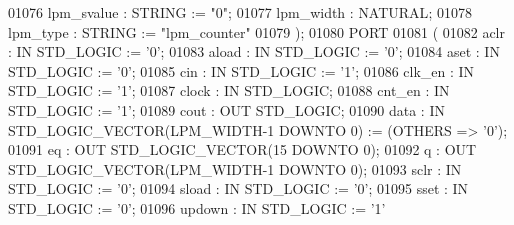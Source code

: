 \begin{DoxyCode}
{01076         lpm\_svalue  :   \textcolor{comment}{STRING} := "\textcolor{vhdllogic}{0}";
01077         lpm\_width   :   \textcolor{comment}{NATURAL};
01078         lpm\_type    :   \textcolor{comment}{STRING} := \textcolor{keyword}{"lpm\_counter"}
01079      );
01080      \textcolor{keywordflow}{PORT}
01081      ( 
01082         aclr    :   \textcolor{keywordflow}{IN} \textcolor{comment}{STD\_LOGIC} := '\textcolor{vhdllogic}{}\textcolor{vhdllogic}{0}';
01083         aload   :   \textcolor{keywordflow}{IN} \textcolor{comment}{STD\_LOGIC} := '\textcolor{vhdllogic}{}\textcolor{vhdllogic}{0}';
01084         aset    :   \textcolor{keywordflow}{IN} \textcolor{comment}{STD\_LOGIC} := '\textcolor{vhdllogic}{}\textcolor{vhdllogic}{0}';
01085         cin :   \textcolor{keywordflow}{IN} \textcolor{comment}{STD\_LOGIC} := '\textcolor{vhdllogic}{}\textcolor{vhdllogic}{1}';
01086         clk\_en  :   \textcolor{keywordflow}{IN} \textcolor{comment}{STD\_LOGIC} := '\textcolor{vhdllogic}{}\textcolor{vhdllogic}{1}';
01087         clock   :   \textcolor{keywordflow}{IN} \textcolor{comment}{STD\_LOGIC};
01088         cnt\_en  :   \textcolor{keywordflow}{IN} \textcolor{comment}{STD\_LOGIC} := '\textcolor{vhdllogic}{}\textcolor{vhdllogic}{1}';
01089         cout    :   \textcolor{keywordflow}{OUT} \textcolor{comment}{STD\_LOGIC};
01090         data    :   \textcolor{keywordflow}{IN} \textcolor{comment}{STD\_LOGIC\_VECTOR}(LPM\_WIDTH\textcolor{vhdlchar}{-}\textcolor{vhdllogic}{}\textcolor{vhdllogic}{1} \textcolor{keywordflow}{DOWNTO} \textcolor{vhdllogic}{}\textcolor{vhdllogic}{0}) := (\textcolor{keywordflow}{OTHERS} => '\textcolor{vhdllogic}{}\textcolor{vhdllogic}{0}');
01091         eq  :   \textcolor{keywordflow}{OUT} \textcolor{comment}{STD\_LOGIC\_VECTOR}(\textcolor{vhdllogic}{}\textcolor{vhdllogic}{15} \textcolor{keywordflow}{DOWNTO} \textcolor{vhdllogic}{}\textcolor{vhdllogic}{0});
01092         q   :   \textcolor{keywordflow}{OUT} \textcolor{comment}{STD\_LOGIC\_VECTOR}(LPM\_WIDTH\textcolor{vhdlchar}{-}\textcolor{vhdllogic}{}\textcolor{vhdllogic}{1} \textcolor{keywordflow}{DOWNTO} \textcolor{vhdllogic}{}\textcolor{vhdllogic}{0});
01093         sclr    :   \textcolor{keywordflow}{IN} \textcolor{comment}{STD\_LOGIC} := '\textcolor{vhdllogic}{}\textcolor{vhdllogic}{0}';
01094         sload   :   \textcolor{keywordflow}{IN} \textcolor{comment}{STD\_LOGIC} := '\textcolor{vhdllogic}{}\textcolor{vhdllogic}{0}';
01095         sset    :   \textcolor{keywordflow}{IN} \textcolor{comment}{STD\_LOGIC} := '\textcolor{vhdllogic}{}\textcolor{vhdllogic}{0}';
01096         updown  :   \textcolor{keywordflow}{IN} \textcolor{comment}{STD\_LOGIC} := '\textcolor{vhdllogic}{}\textcolor{vhdllogic}{1}'
}
\end{DoxyCode}
